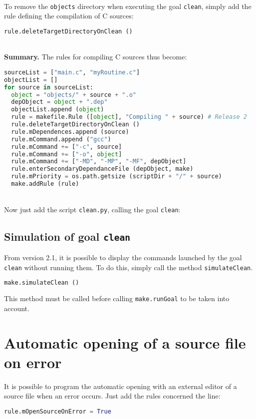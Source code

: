 \documentclass[a4paper,11pt]{extarticle}
\begin{document}
~\\To remove the \texttt{objects} directory when executing the goal \texttt{clean}, simply add the rule defining the compilation of C sources:

\begin{lstlisting}[language=py]
  rule.deleteTargetDirectoryOnClean ()
\end{lstlisting}

~\\{\bf Summary.} The rules for compiling C sources thus become:
\begin{lstlisting}[language=py]
sourceList = ["main.c", "myRoutine.c"]
objectList = []
for source in sourceList:
  object = "objects/" + source + ".o"
  depObject = object + ".dep"
  objectList.append (object)
  rule = makefile.Rule ([object], "Compiling " + source) # Release 2
  rule.deleteTargetDirectoryOnClean ()
  rule.mDependences.append (source)
  rule.mCommand.append ("gcc")
  rule.mCommand += ["-c", source]
  rule.mCommand += ["-o", object]
  rule.mCommand += ["-MD", "-MP", "-MF", depObject]
  rule.enterSecondaryDependanceFile (depObject, make)
  rule.mPriority = os.path.getsize (scriptDir + "/" + source)
  make.addRule (rule)
\end{lstlisting}

~\\Now just add the script \texttt{clean.py}, calling the goal \texttt{clean}:



\subsection{Simulation of goal \texttt{clean}}\label{simulationButClean}

From version 2.1, it is possible to display the commands launched by the goal \texttt{clean} without running them. To do this, simply call the method \texttt{simulateClean}.

\begin{lstlisting}[language=py]
  make.simulateClean ()
\end{lstlisting}

This method must be called before calling \texttt{make.runGoal}  to be taken into account.

\section{Automatic opening of a source file on error}

It is possible to program the automatic opening with an external editor of a source file when an error occurs. Just add the rules concerned the line:
\begin{lstlisting}[language=py]
  rule.mOpenSourceOnError = True
\end{lstlisting}
\end{document}
